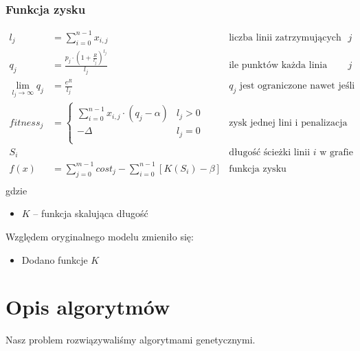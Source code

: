 \documentclass[12pt,a4paper]{article}
\begin{document}
\subsubsection{Funkcja zysku}
\begin{align*}
    l_j                         & = \sum_{i=0}^{n-1} x_{i, j}                                               & \text{liczba linii zatrzymujących się na przystanku $j$}                 \\
    q_j                         & = \frac{p_j \cdot (1+\frac{R}{l_j})^{l_j}}{l_j}                           & \text{ile punktów każda linia uzyskuje z przystanku $j$}                 \\
    \lim_{l_{j}\to\infty} q_{j} & =  \frac{e^R}{l_j}                                                        & \text{$q_{j}$ jest ograniczone nawet jeśli liczba lini jest bardzo duża} \\
    fitness_{j}                    & = \begin{cases}
        \sum_{i=0}^{n-1} x_{i,j} \cdot (q_j-\alpha) & l_j > 0 \\
        -\Delta                                     & l_j = 0 \\
    \end{cases}                                               & \text{zysk jednej lini  i penalizacja nieodwiedzonych przystanków}                           \\
    S_{i}                       &                                                                           & \text{długość ścieżki linii $i$ w grafie}                                \\
    f(x)                        & = \sum_{j=0}^{m-1} cost_{j} - \sum_{i=0}^{n-1} \left[ K(S_{i})-\beta \right] & \text{funkcja zysku}                                                    \\
\end{align*}
gdzie
\begin{itemize}
	\item $K$ -- funkcja skalująca długość
\end{itemize}
Względem oryginalnego modelu zmieniło się:
\begin{itemize}
	\item Dodano funkcje $K$
\end{itemize}







\section{Opis algorytmów}
Nasz problem rozwiązywaliśmy algorytmami genetycznymi.
\end{document}
